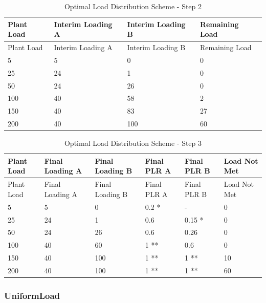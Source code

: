 \begin{longtable}[c]{|l|l|l|l|}
    \caption{Optimal Load Distribution Scheme - Step 2}
    \label{tab:optimal-load-step-2}\\

\hline
Plant Load & Interim Loading A & Interim Loading B & Remaining Load \\ \hline
\endfirsthead

\hline
Plant Load & Interim Loading A & Interim Loading B & Remaining Load \\ \hline
\endhead

5 & 5 & 0 & 0 \\ \hline
25 & 24 & 1 & 0 \\ \hline
50 & 24 & 26 & 0 \\ \hline
100 & 40 & 58 & 2 \\ \hline
150 & 40 & 83 & 27 \\ \hline
200 & 40 & 100 & 60 \\ \hline
\end{longtable}



\begin{longtable}[c]{|l|l|l|l|l|l|}
    \caption{Optimal Load Distribution Scheme - Step 3}
    \label{tab:optimal-load-step-3}\\
\hline
Plant Load & Final Loading A & Final Loading B & Final PLR A & Final PLR B & Load Not Met \\ \hline
\endfirsthead

\hline
Plant Load & Final Loading A & Final Loading B & Final PLR A & Final PLR B & Load Not Met \\ \hline
\endhead

5 & 5 & 0 & 0.2 * & - & 0 \\ \hline
25 & 24 & 1 & 0.6 & 0.15 * & 0 \\ \hline
50 & 24 & 26 & 0.6 & 0.26 & 0 \\ \hline
100 & 40 & 60 & 1 ** & 0.6 & 0 \\ \hline
150 & 40 & 100 & 1 ** & 1 ** & 10 \\ \hline
200 & 40 & 100 & 1 ** & 1 ** & 60 \\ \hline
\end{longtable}




\subsubsection{UniformLoad}%
\label{ssub:uniformload}


